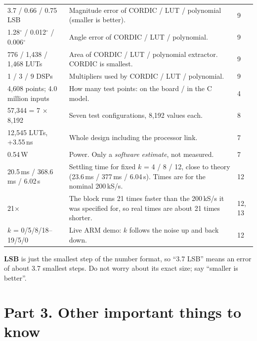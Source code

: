 \documentclass[11pt,a4paper]{article}
\begin{document}
\begin{longtable}{@{}p{4.3cm}p{9.9cm}p{1.4cm}@{}}
3.7 / 0.66 / 0.75 LSB & Magnitude error of CORDIC / LUT / polynomial (smaller is better). & 9\\
1.28$^\circ$ / 0.012$^\circ$ / 0.006$^\circ$ & Angle error of CORDIC / LUT / polynomial. & 9\\
776 / 1,438 / 1,468 LUTs & Area of CORDIC / LUT / polynomial extractor. CORDIC is smallest. & 9\\
1 / 3 / 9 DSPs & Multipliers used by CORDIC / LUT / polynomial. & 9\\
4,608 points; 4.0 million inputs & How many test points: on the board / in the C model. & 4\\
57,344 = 7 $\times$ 8,192 & Seven test configurations, 8,192 values each. & 8\\
12,545 LUTs, +3.55\,ns & Whole design including the processor link. & 7\\
0.54\,W & Power. Only a \emph{software estimate}, not measured. & 7\\
20.5\,ms / 368.6\,ms / 6.02\,s & Settling time for fixed $k$ = 4 / 8 / 12, close to theory (23.6\,ms / 377\,ms / 6.04\,s). Times are for the nominal 200\,kS/s. & 12\\
21$\times$ & The block runs 21 times faster than the 200\,kS/s it was specified for, so real times are about 21 times shorter. & 12, 13\\
$k$ = 0/5/8/18--19/5/0 & Live ARM demo: $k$ follows the noise up and back down. & 12\\
\bottomrule
\end{longtable}

\begin{careful}
\textbf{LSB} is just the smallest step of the number format, so ``3.7 LSB'' means an error of about 3.7 smallest steps. Do not worry about its exact size; say ``smaller is better''.
\end{careful}

\section{Part 3. Other important things to know}
\end{document}
